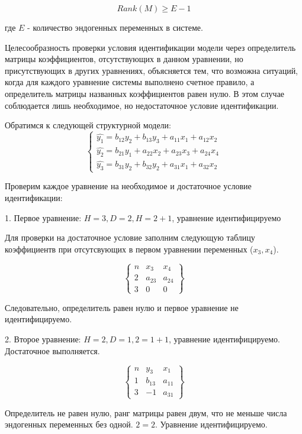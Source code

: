 \documentclass[aps,%
12pt,%
final,%
oneside,
onecolumn,%
musixtex, %
superscriptaddress,%
centertags]{article} %
\theoremstyle{plain}
\theoremstyle{definition}
\theoremstyle{remark}
\begin{document}
$$Rank(M) \geq E-1$$

где $E$ - количество эндогенных переменных в системе.

Целесообразность проверки условия идентификации модели через определитель матрицы коэффициентов, отсутствующих в данном уравнении, но присутствующих в других уравнениях, объясняется тем, что возможна ситуаций, когда для каждого уравнение системы выполнено счетное правило, а определитель матрицы названных коэффициентов равен нулю. В этом случае соблюдается лишь необходимое, но недостаточное условие идентификации.

Обратимся к следующей структурной модели:
$$\left \{
\begin{matrix}
	\hat{y_1} = b_{12}y_2 + b_{13}y_3  +  a_{11}x_1 + a_{12}x_2\\
	\hat{y_2} = b_{21}y_1 + a_{22}x_2  +  a_{23}x_3 + a_{24}x_4\\
	\hat{y_3} = b_{31}y_2 + b_{32}y_2  +  a_{31}x_1 + a_{32}x_2

\end{matrix}
\right.
$$

Проверим каждое уравнение на необходимое и достаточное условие идентификации:

1. Первое уравнение: $H=3, D = 2, H = 2 + 1$, уравнение идентифицируемо

Для проверки на достаточное условие заполним следующую таблицу коэффициентв при отсутсвующих в первом уравнении переменных ($x_3,x_4$).

$$\left \{
\begin{matrix}
	n & x_3 & x_4 \\
	2 & a_{23} & a_{24} \\
	3 & 0 & 0 

\end{matrix}
\right \}
$$

Следовательно, определитель равен нулю и первое уравнение не идентифицируемо.

2. Второе уравнение: $H=2, D = 1, 2 = 1 + 1$, уравнение идентифицируемо. Достаточное выполняется.

$$\left \{
\begin{matrix}
	n & y_3 & x_1 \\
	1 & b_{13} & a_{11} \\
	3 & -1 & a_{31} 

\end{matrix}
\right \}
$$

Определитель не равен нулю, ранг матрицы равен двум, что не меньше числа эндогенных переменных без одной. $2=2$. Уравнение идентифицируемо.
\end{document}
